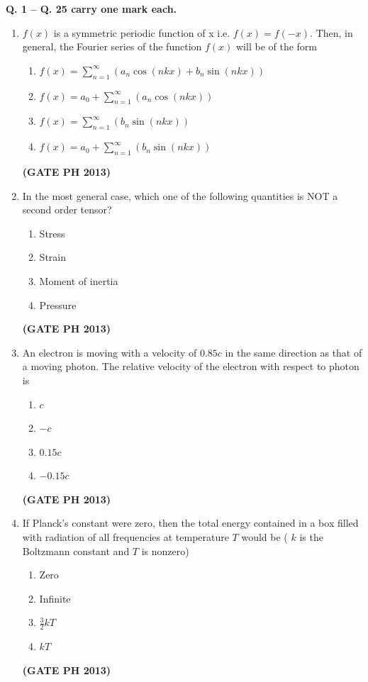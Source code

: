 \documentclass[14pt, a4paper]{extarticle}
\begin{document}
\textbf{Q. 1 -- Q. 25 carry one mark each.}

\begin{enumerate}[label=\textbf{Q. \arabic*}]

\item $f(x)$ is a symmetric periodic function of x i.e. $f(x) = f(-x)$. Then, in general, the Fourier series of the function $f(x)$ will be of the form
\begin{enumerate}
        \item $ f(x) = \sum_{n=1}^{\infty} (a_n \cos(nkx) + b_n \sin(nkx)) $
        \item $ f(x) = a_0 + \sum_{n=1}^{\infty} (a_n \cos(nkx)) $
        \item $ f(x) = \sum_{n=1}^{\infty} (b_n \sin(nkx)) $
        \item $ f(x) = a_0 + \sum_{n=1}^{\infty} (b_n \sin(nkx)) $
    \end{enumerate}
    \hfill \textbf{(GATE PH 2013)}

\item In the most general case, which one of the following quantities is NOT a second order tensor?
\begin{multicols}{2}
    \begin{enumerate}
        \item Stress
        \item Strain
        \item Moment of inertia
        \item Pressure
    \end{enumerate}
\end{multicols}
\hfill \textbf{(GATE PH 2013)}

\item An electron is moving with a velocity of $0.85c$ in the same direction as that of a moving photon. The relative velocity of the electron with respect to photon is
\begin{multicols}{4}
    \begin{enumerate}
        \item $c$
        \item $-c$
        \item $0.15c$
        \item $-0.15c$
    \end{enumerate}
\end{multicols}
\hfill \textbf{(GATE PH 2013)}

 \item If Planck's constant were zero, then the total energy contained in a box filled with radiation of all frequencies at temperature $T$ would be ( $k$ is the Boltzmann constant and $T$ is nonzero)
    \begin{multicols}{4}
        \begin{enumerate}
            \item Zero
            \item Infinite
            \item $\frac{3}{2}kT$
            \item $kT$
        \end{enumerate}
    \end{multicols}
    \hfill \textbf{(GATE PH 2013)}


\end{enumerate}
\end{document}
